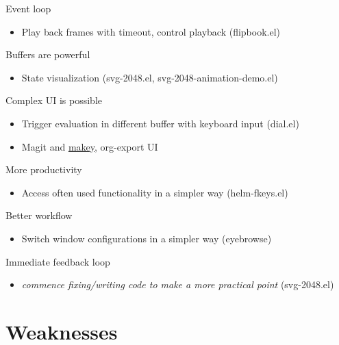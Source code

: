 \documentclass[presentation]{beamer}
\begin{document}
\begin{frame}[label=sec-5-3]{Event loop}
\begin{itemize}
\item Play back frames with timeout, control playback (flipbook.el)
\end{itemize}
\end{frame}

\begin{frame}[label=sec-5-4]{Buffers are powerful}
\begin{itemize}
\item State visualization (svg-2048.el, svg-2048-animation-demo.el)
\end{itemize}
\end{frame}

\begin{frame}[label=sec-5-5]{Complex UI is possible}
\begin{itemize}
\item Trigger evaluation in different buffer with keyboard input (dial.el)
\item Magit and \href{https://github.com/mickeynp/makey}{makey}, org-export UI
\end{itemize}
\end{frame}

\begin{frame}[label=sec-5-6]{More productivity}
\begin{itemize}
\item Access often used functionality in a simpler way (helm-fkeys.el)
\end{itemize}
\end{frame}

\begin{frame}[label=sec-5-7]{Better workflow}
\begin{itemize}
\item Switch window configurations in a simpler way (eyebrowse)
\end{itemize}
\end{frame}

\begin{frame}[label=sec-5-8]{Immediate feedback loop}

\begin{itemize}
\item \emph{commence fixing/writing code to make a more practical point}
  (svg-2048.el)
\end{itemize}
\end{frame}

\section{Weaknesses}
\label{sec-6}
\end{document}
